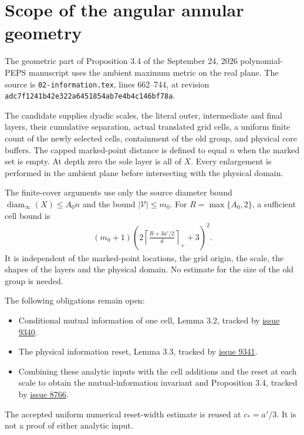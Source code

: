 \section*{Scope of the angular annular geometry}

The geometric part of Proposition 3.4 of the September 24, 2026
polynomial-PEPS manuscript uses the ambient maximum metric on the real
plane. The source is \texttt{02-information.tex}, lines 662--744, at
revision \texttt{adc7f1241b42e322a6451854ab7e4b4c146bf78a}.

The candidate supplies dyadic scales, the literal outer, intermediate and
final layers, their cumulative separation, actual translated grid cells,
a uniform finite count of the newly selected cells, containment of the old
group, and physical core buffers. The capped marked-point distance is
defined to equal $n$ when the marked set is empty. At depth zero the sole
layer is all of $X$. Every enlargement is performed in the ambient plane
before intersecting with the physical domain.

The finite-cover arguments use only the source diameter bound
$\operatorname{diam}_{\infty}(X)\le A_0n$ and the bound $|\mathcal V|\le m_0$.
For $R=\max\{A_0,2\}$, a sufficient cell bound is
\begin{align*}
 (m_0+1)\left(2\left\lceil\frac{R+3a'/2}{d}\right\rceil_{+}+3\right)^2.
\end{align*}
It is independent of the marked-point locations, the grid origin, the
scale, the shapes of the layers and the physical domain. No estimate for
the size of the old group is needed.

The following obligations remain open:
\begin{itemize}
\item Conditional mutual information of one cell, Lemma 3.2, tracked by
  \href{https://github.com/LionSR/TNLean/issues/9340}{issue 9340}.
\item The physical information reset, Lemma 3.3, tracked by
  \href{https://github.com/LionSR/TNLean/issues/9341}{issue 9341}.
\item Combining these analytic inputs with the cell additions and the
  reset at each scale to obtain the mutual-information invariant and
  Proposition 3.4, tracked by
  \href{https://github.com/LionSR/TNLean/issues/8766}{issue 8766}.
\end{itemize}
The accepted uniform numerical reset-width estimate is reused at
$c_*=a'/3$. It is not a proof of either analytic input.

